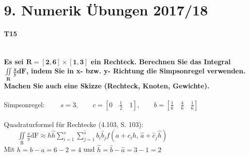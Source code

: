 \documentclass[10pt,a4paper]{article}
\begin{document}
	\section*{9. Numerik Übungen 2017/18}
	\paragraph{T15}\mbox{}\\
	\textbf{%
		Es sei $\mathbf{R = [2,6]\times[1,3]}$ ein Rechteck. Berechnen Sie das Integral $\mathbf{\iint\limits_\text{R}\frac{x}{y}dF}$, indem Sie in x- bzw. y- Richtung die Simpsonregel verwenden. Machen Sie auch eine Skizze (Rechteck, Knoten, Gewichte).
	}\\\\
	Simpsonregel: $\qquad s=3, \qquad c=\left[ 0 \quad \frac{1}{2} \quad 1\right] , \qquad b=\left[ \frac{1}{6}\quad \frac{4}{6}\quad \frac{1}{6}\right] $ \\\\
	Quadraturformel für Rechtecke (4.103, S. 103):$ \qquad
		\iint\limits_\text{R}\frac{x}{y}\text{dF} \approx h\hat{h}\sum\limits_{i=1}^{s} \sum\limits_{j=1}^{\hat{s}}b_i\hat{b}_jf(a+c_ih,\,\hat{a}+\hat{c}_j\hat{h})$ \\
	Mit $h=b-a=6-2=4$ und $\hat{h}=\hat{b}-\hat{a}=3-1=2$  \\
\end{document}
